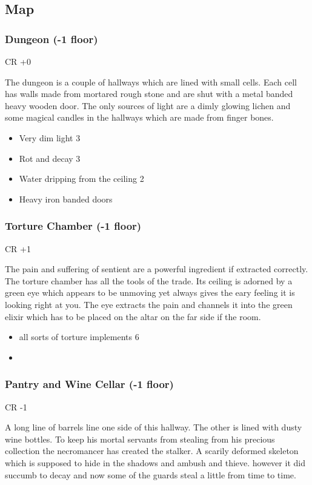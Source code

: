 \documentclass[11pt]{article}
\begin{document}
{\subsection{Map}
\label{sec:org6b1b351}

\subsubsection{Dungeon (-1 floor)}
\label{sec:orgd7ac4cb}
CR +0

The dungeon is a couple of hallways which are lined with small cells. Each cell has walls made from mortared rough stone and are shut with a metal banded heavy wooden door. The only sources of light are a dimly glowing lichen and some magical candles in the hallways which are made from finger bones.

\begin{itemize}
\item Very dim light 3
\item Rot and decay 3
\item Water dripping from the ceiling 2
\item Heavy iron banded doors
\end{itemize}
\subsubsection{Torture Chamber (-1 floor)}
\label{sec:org8d6f3e2}
CR +1

The pain and suffering of sentient are a powerful ingredient if extracted correctly. The torture chamber has all the tools of the trade. Its ceiling is adorned by a green eye which appears to be unmoving yet always gives the eary feeling it is looking right at you. The eye extracts the pain and channels it into the green elixir which has to be placed on the altar on the far side if the room.

\begin{itemize}
\item all sorts of torture implements 6
\item 
\end{itemize}
\subsubsection{Pantry and Wine Cellar (-1 floor)}
\label{sec:org2d119d9}
CR -1

A long line of barrels line one side of this hallway. The other is lined with dusty wine bottles. To keep his mortal servants from stealing from his precious collection the necromancer has created the stalker. A scarily deformed skeleton which is supposed to hide in the shadows and ambush and thieve. however it did succumb to decay and now some of the guards steal a little from time to time.

}
\end{document}
